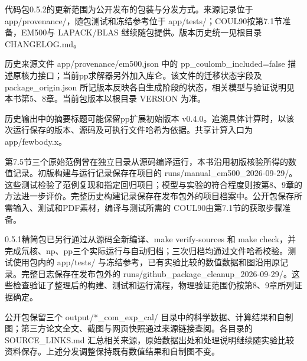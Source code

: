 \documentclass[UTF8,a4paper,zihao=5,fontset=fandol]{ctexart}
\begin{document}
代码包0.5.2的更新范围为公开发布的包装与分发方式。来源记录位于 {\ttfamily\small app/\allowbreak{}provenance/\allowbreak{}}，随包测试和冻结参考位于 {\ttfamily\small app/\allowbreak{}tests/\allowbreak{}}；COUL90按第7.1节准备，EM500与 LAPACK/BLAS 继续随包提供。版本历史统一见根目录 {\ttfamily\small CHANGELOG.\allowbreak{}md}。

历史来源文件 {\ttfamily\small app/\allowbreak{}provenance/\allowbreak{}em500.\allowbreak{}json} 中的 {\ttfamily\small pp\_\allowbreak{}coulomb\_\allowbreak{}included=\allowbreak{}false} 描述原核力接口；当前pp求解器另外加入库仑。该文件的迁移状态字段及 {\ttfamily\small package\_\allowbreak{}origin.\allowbreak{}json} 所记版本反映各自生成阶段的状态，相关模型与验证说明见本书第5、8章。当前包版本以根目录 {\ttfamily\small VERSION} 为准。

历史输出中的摘要标题可能保留pp扩展初始版本 v0.4.0。追溯具体计算时，以该次运行保存的版本、源码及可执行文件哈希为依据。共享计算入口为 {\ttfamily\small app/\allowbreak{}fewbody.\allowbreak{}x}。

第7.5节三个原始范例曾在独立目录从源码编译运行，本书沿用初版核验所得的数值记录。初版构建与运行记录保存在项目的 {\ttfamily\small runs/\allowbreak{}manual\_\allowbreak{}em500\_\allowbreak{}2026-09-29/\allowbreak{}}。这些测试检验了范例复现和指定回归项目；模型与实验的符合程度则按第8、9章的方法进一步评价。完整历史构建记录保存在发布包外的项目档案中。公开包保存所需输入、测试和PDF素材，编译与测试所需的 COUL90由第7.1节的获取步骤准备。

0.5.1精简包已另行通过从源码全新编译、{\ttfamily\small make verify-sources} 和 {\ttfamily\small make check}，并完成氘核、np、pp三个实际运行与自动归档；三次归档均通过文件哈希校验。测试使用包内的 {\ttfamily\small app/\allowbreak{}tests/\allowbreak{}} 与冻结参考，已有实验比较的数值数据和图沿用原记录。完整日志保存在发布包外的 {\ttfamily\small runs/\allowbreak{}github\_\allowbreak{}package\_\allowbreak{}cleanup\_\allowbreak{}2026-09-29/\allowbreak{}}。这些检查验证了整理后的构建、测试和运行流程，物理验证范围仍按第8、9章所列证据确定。

公开包保留三个 {\ttfamily\small output/\allowbreak{}*\_\allowbreak{}com\_\allowbreak{}exp\_\allowbreak{}cal/\allowbreak{}} 目录中的科学数据、计算结果和自制图；第三方论文全文、截图与网页快照通过来源链接查阅。各目录的 {\ttfamily\small SOURCE\_\allowbreak{}LINKS.\allowbreak{}md} 汇总相关来源，原始数据出处和处理说明继续随实验比较资料保存。上述分发调整保持既有数值结果和自制图不变。
\end{document}
